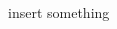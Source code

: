 \documentclass[../../main.tex]{subfiles}
\begin{document}
\begin{thebibliography}{9}

 insert something

\end{thebibliography}
\end{document}
